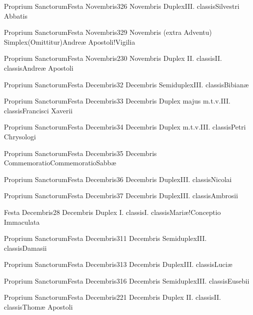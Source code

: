 \documentclass[psalterium-feriale.tex]{subfiles}
\begin{document}
	{Proprium Sanctorum}{Festa Novembris}{3}{26 Novembris}
	{Duplex}{III. classis}{Silvestri Abbatis}
	{}
	{}

	{Proprium Sanctorum}{Festa Novembris}{3}{29 Novembris (extra Adventu)}
	{Simplex}{(Omittitur)}{Andreæ Apostoli!Vigilia}
	{}
	{}
\invitferia

	{Proprium Sanctorum}{Festa Novembris}{2}{30 Novembris}
	{Duplex II. classis}{II. classis}{Andreæ Apostoli}
	{}
	{}
\psalmodiapropria

	{Proprium Sanctorum}{Festa Decembris}{3}{2 Decembris}
	{Semiduplex}{III. classis}{Bibianæ}
	{}
	{}

	{Proprium Sanctorum}{Festa Decembris}{3}{3 Decembris}
	{Duplex majus m.t.v.}{III. classis}{Francisci Xaverii}
	{}
	{}

	{Proprium Sanctorum}{Festa Decembris}{3}{4 Decembris}
	{Duplex m.t.v.}{III. classis}{Petri Chrysologi}
	{}
	{}

	{Proprium Sanctorum}{Festa Decembris}{3}{5 Decembris}
	{Commemoratio}{Commemoratio}{Sabbæ}
	{}
	{}
\invitferia

	{Proprium Sanctorum}{Festa Decembris}{3}{6 Decembris}
	{Duplex}{III. classis}{Nicolai}
	{}
	{}

	{Proprium Sanctorum}{Festa Decembris}{3}{7 Decembris}
	{Duplex}{III. classis}{Ambrosii}
	{}
	{}

	{Festa Decembris}{2}{8 Decembris}
	{Duplex I. classis}{I. classis}{Mariæ!Conceptio Immaculata}
	{}
	{}
\psalmodiapropria
{}

	{Proprium Sanctorum}{Festa Decembris}{3}{11 Decembris}
	{Semiduplex}{III. classis}{Damasii}
	{}
	{}

	{Proprium Sanctorum}{Festa Decembris}{3}{13 Decembris}
	{Duplex}{III. classis}{Luciæ}
	{}
	{}

	{Proprium Sanctorum}{Festa Decembris}{3}{16 Decembris}
	{Semiduplex}{III. classis}{Eusebii}
	{}
	{}

	{Proprium Sanctorum}{Festa Decembris}{2}{21 Decembris}
	{Duplex II. classis}{II. classis}{Thomæ Apostoli}
	{}
	{}
\psalmodiapropria
\end{document}
